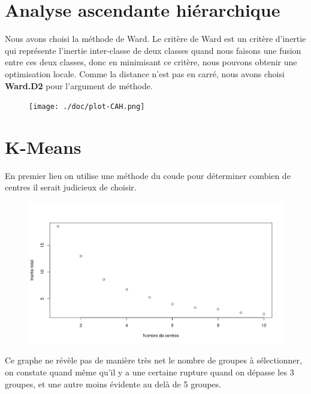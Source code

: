 \documentclass[a4paper, titlepage]{report}
\begin{document}
\section{Analyse ascendante hiérarchique}
Nous avons choisi la méthode de Ward. Le critère de Ward est un critère d'inertie qui représente l'inertie inter-classe de deux classes quand nous faisons une fusion entre ces deux classes, donc en minimisant ce critère, nous pouvons obtenir une optimisation locale. Comme la distance n'est pas en carré, nous avons choisi \textbf{Ward.D2} pour l'argument de méthode.
\begin{figure}[h]
	\begin{center}
		\texttt{[image: ./doc/plot-CAH.png]}
	\end{center}
\end{figure}

\section{K-Means}

En premier lieu on utilise une méthode du coude pour déterminer combien de centres il serait judicieux de choisir.

\begin{figure}[h]
	\begin{center}
		\includegraphics[scale = 0.32]{./doc/plot-kmeans-mininertie.png}
	\end{center}
\end{figure}

Ce graphe ne révèle pas de manière très net le nombre de groupes à sélectionner, on constate quand même qu'il y a une certaine rupture quand on dépasse les 3 groupes, et une autre moins évidente au delà de 5 groupes. 
\end{document}
